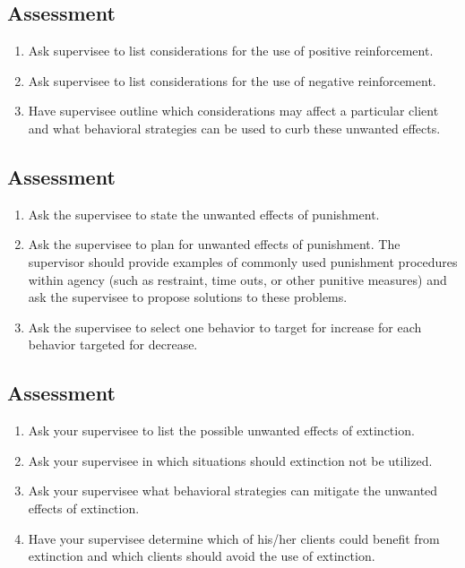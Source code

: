 \subsection{Assessment}
\begin{enumerate}
\item Ask supervisee to list considerations for the use of positive reinforcement.
\item Ask supervisee to list considerations for the use of negative reinforcement.
\item Have supervisee outline which considerations may affect a particular client and what behavioral strategies can be used to curb these unwanted effects.
\end{enumerate}
%
\subsection{Assessment}
\begin{enumerate}
\item Ask the supervisee to state the unwanted effects of punishment.
\item Ask the supervisee to plan for unwanted effects of punishment.  The supervisor should provide examples of commonly used punishment procedures within agency (such as restraint, time outs, or other punitive measures) and ask the supervisee to propose solutions to these problems. 
\item Ask the supervisee to select one behavior to target for increase for each behavior targeted for decrease. 
\end{enumerate}
%
\subsection{Assessment}
\begin{enumerate}
\item Ask your supervisee to list the possible unwanted effects of extinction.
\item Ask your supervisee in which situations should extinction not be utilized.
\item Ask your supervisee what behavioral strategies can mitigate the unwanted effects of extinction.
\item Have your supervisee determine which of his/her clients could benefit from extinction and which clients should avoid the use of extinction. 
%
\end{enumerate}
%
